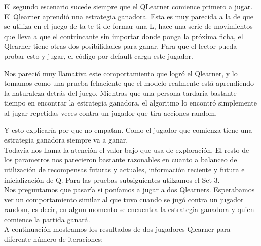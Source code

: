 El segundo escenario sucede siempre que el QLearner comience primero a jugar. El Qlearner aprendi\'o una estrategia ganadora. Esta es muy parecida a la de que se utiliza en el juego de ta-te-ti de formar una L, hace una serie de movimientos que lleva a que el contrincante sin importar donde ponga la pr\'oxima ficha, el Qlearner tiene otras dos posibilidades para ganar. Para que el lector pueda probar esto y jugar, el c\'odigo por default carga este jugador.

Nos pareci\'o muy llamativa este comportamiento que logr\'o el Qlearner, y lo tomamos como una prueba fehaciente que el modelo realmente est\'a aprendiendo la naturaleza detr\'as del juego. Mientras que una persona tardar\'ia bastante tiempo en encontrar la estrategia ganadora, el algoritmo lo encontr\'o simplemente al jugar repetidas veces contra un jugador que tira acciones random.

Y esto explicaría por que no empatan. Como el jugador que comienza tiene una estrategia ganadora siempre va a ganar.\\

Todavía nos llama la atención el valor bajo que usa de exploración. El resto de los parametros nos parecieron bastante razonables en cuanto a balanceo de utilización de recompensas futuras y actuales, información reciente y futura e inicialización de Q.
Para las pruebas subsiguientes utilzamos el Set 3.\\

Nos preguntamos que pasaría si poníamos a jugar a dos Qlearners. Esperabamos ver un comportamiento similar al que tuvo cuando se jugó contra un jugador random, es decir, en algun momento se encuentra la estrategia ganadora y quien comience la partida ganará.\\

A continuación mostramos los resultados de dos jugadores Qlearner para diferente número de iteraciones:

